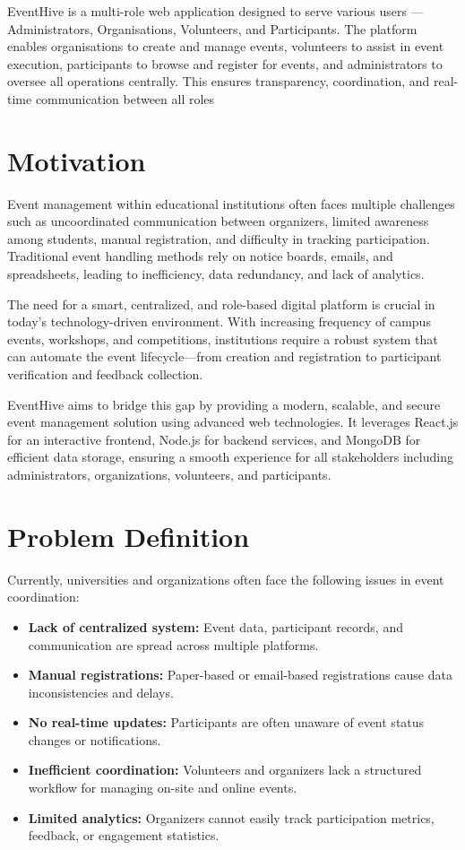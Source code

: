 \documentclass[12pt,a4paper]{report}
\begin{document}
EventHive is a multi-role web application designed to serve various users — Administrators, Organisations, Volunteers, and Participants. The platform enables organisations to create and manage events, volunteers to assist in event execution, participants to browse and register for events, and administrators to oversee all operations centrally. This ensures transparency, coordination, and real-time communication between all roles
\section{Motivation}
Event management within educational institutions often faces multiple challenges such as uncoordinated communication between organizers, limited awareness among students, manual registration, and difficulty in tracking participation. Traditional event handling methods rely on notice boards, emails, and spreadsheets, leading to inefficiency, data redundancy, and lack of analytics.

The need for a smart, centralized, and role-based digital platform is crucial in today’s technology-driven environment. With increasing frequency of campus events, workshops, and competitions, institutions require a robust system that can automate the event lifecycle—from creation and registration to participant verification and feedback collection.

EventHive aims to bridge this gap by providing a modern, scalable, and secure event management solution using advanced web technologies. It leverages React.js for an interactive frontend, Node.js for backend services, and MongoDB for efficient data storage, ensuring a smooth experience for all stakeholders including administrators, organizations, volunteers, and participants.

\section{Problem Definition}
Currently, universities and organizations often face the following issues in event coordination:
\begin{itemize}
    \item \textbf{Lack of centralized system:} Event data, participant records, and communication are spread across multiple platforms.
    \item \textbf{Manual registrations:} Paper-based or email-based registrations cause data inconsistencies and delays.
    \item \textbf{No real-time updates:} Participants are often unaware of event status changes or notifications.
    \item \textbf{Inefficient coordination:} Volunteers and organizers lack a structured workflow for managing on-site and online events.
    \item \textbf{Limited analytics:} Organizers cannot easily track participation metrics, feedback, or engagement statistics.
\end{itemize}
\end{document}

